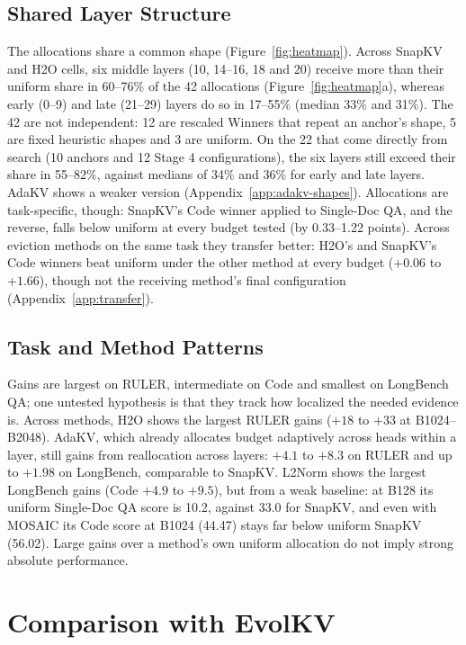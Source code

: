 \documentclass[11pt]{article}
\begin{document}
\subsection{Shared Layer Structure}
\label{sec:shared}

The allocations share a common shape (Figure~\ref{fig:heatmap}). Across SnapKV and H2O cells, six middle layers (10, 14--16, 18 and 20) receive more than their uniform share in 60--76\% of the 42 allocations (Figure~\ref{fig:heatmap}a), whereas early (0--9) and late (21--29) layers do so in 17--55\% (median 33\% and 31\%). The 42 are not independent: 12 are rescaled Winners that repeat an anchor's shape, 5 are fixed heuristic shapes and 3 are uniform. On the 22 that come directly from search (10 anchors and 12 Stage 4 configurations), the six layers still exceed their share in 55--82\%, against medians of 34\% and 36\% for early and late layers. AdaKV shows a weaker version (Appendix~\ref{app:adakv-shapes}). Allocations are task-specific, though: SnapKV's Code winner applied to Single-Doc QA, and the reverse, falls below uniform at every budget tested (by 0.33--1.22 points). Across eviction methods on the same task they transfer better: H2O's and SnapKV's Code winners beat uniform under the other method at every budget ($+0.06$ to $+1.66$), though not the receiving method's final configuration (Appendix~\ref{app:transfer}).

\subsection{Task and Method Patterns}

Gains are largest on RULER, intermediate on Code and smallest on LongBench QA; one untested hypothesis is that they track how localized the needed evidence is. Across methods, H2O shows the largest RULER gains ($+18$ to $+33$ at B1024--B2048). AdaKV, which already allocates budget adaptively across heads within a layer, still gains from reallocation across layers: $+4.1$ to $+8.3$ on RULER and up to $+1.98$ on LongBench, comparable to SnapKV. L2Norm shows the largest LongBench gains (Code $+4.9$ to $+9.5$), but from a weak baseline: at B128 its uniform Single-Doc QA score is 10.2, against 33.0 for SnapKV, and even with MOSAIC its Code score at B1024 (44.47) stays far below uniform SnapKV (56.02). Large gains over a method's own uniform allocation do not imply strong absolute performance.

\section{Comparison with EvolKV}
\label{sec:evolkv}
\end{document}
